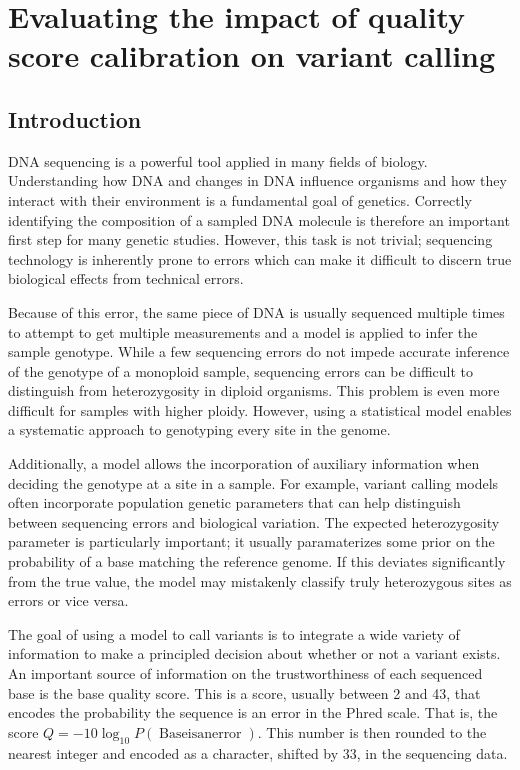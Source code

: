 \chapter{Evaluating the impact of quality score calibration on variant calling}
\label{ch:evaluating}
\section{Introduction}

DNA sequencing is a powerful tool applied in many fields of biology. Understanding how DNA and changes in DNA influence organisms and how they interact with their environment is a fundamental goal of genetics. Correctly identifying the composition of a sampled DNA molecule is therefore an important first step for many genetic studies. However, this task is not trivial; sequencing technology is inherently prone to errors which can make it difficult to discern true biological effects from technical errors. 

Because of this error, the same piece of DNA is usually sequenced multiple times to attempt to get multiple measurements and a model is applied to infer the sample genotype. While a few sequencing errors do not impede accurate inference of the genotype of a monoploid sample, sequencing errors can be difficult to distinguish from heterozygosity in diploid organisms. This problem is even more difficult for samples with higher ploidy. However, using a statistical model enables a systematic approach to genotyping every site in the genome.

Additionally, a model allows the incorporation of auxiliary information when deciding the genotype at a site in a sample. For example, variant calling models often incorporate population genetic parameters that can help distinguish between sequencing errors and biological variation. The expected heterozygosity parameter \theta is particularly important; it usually paramaterizes some prior on the probability of a base matching the reference genome. If this deviates significantly from the true value, the model may mistakenly classify truly heterozygous sites as errors or vice versa.

The goal of using a model to call variants is to integrate a wide variety of information to make a principled decision about whether or not a variant exists. An important source of information on the trustworthiness of each sequenced base is the base quality score. This is a score, usually between 2 and 43, that encodes the probability the sequence is an error in the Phred scale. That is, the score $Q = -10\log_{10}P(\operatorname{Base is an error})$. This number is then rounded to the nearest integer and encoded as a character, shifted by 33, in the sequencing data.

